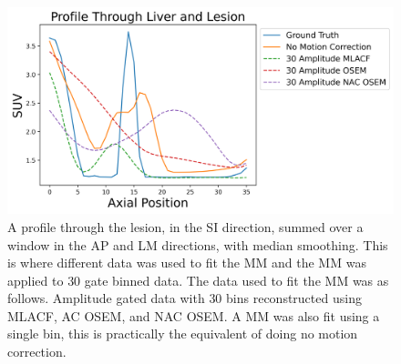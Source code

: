             \begin{figure}
                \centering
                
                \includegraphics[width=1.0\linewidth]{figures/motion_correction_2_results_2_30_amplitude_profile.png}
                
                \captionsetup{singlelinecheck=false}
                \caption{
                    A profile through the lesion, in the \gls{SI} direction, summed over a window in the \gls{AP} and \gls{LM} directions, with median smoothing. This is where different data was used to fit the \gls{MM} and the \gls{MM} was applied to $30$ gate binned data. The data used to fit the \gls{MM} was as follows. Amplitude gated data with $30$ bins reconstructed using \gls{MLACF}, \gls{AC} \gls{OSEM}, and \gls{NAC} \gls{OSEM}. A \gls{MM} was also fit using a single bin, this is practically the equivalent of doing no motion correction.
                }
                
                \label{fig:evaluation_of_pet_ct_motion_correction_incorporating_motion_models_using_mlacf_and_complex_gating_schemes_results_30_amplitude_profile}
            \end{figure}

